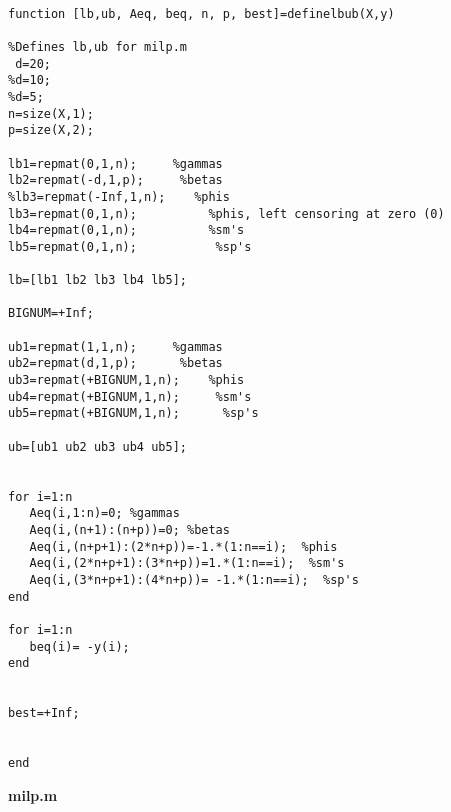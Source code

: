 \documentclass[12pt]{article}
\begin{document}
\begin{lstlisting}

function [lb,ub, Aeq, beq, n, p, best]=definelbub(X,y)

%Defines lb,ub for milp.m
 d=20;
%d=10;
%d=5;
n=size(X,1);
p=size(X,2);

lb1=repmat(0,1,n);     %gammas
lb2=repmat(-d,1,p);     %betas
%lb3=repmat(-Inf,1,n);    %phis
lb3=repmat(0,1,n);          %phis, left censoring at zero (0)
lb4=repmat(0,1,n);          %sm's
lb5=repmat(0,1,n);           %sp's

lb=[lb1 lb2 lb3 lb4 lb5];

BIGNUM=+Inf;

ub1=repmat(1,1,n);     %gammas
ub2=repmat(d,1,p);      %betas
ub3=repmat(+BIGNUM,1,n);    %phis
ub4=repmat(+BIGNUM,1,n);     %sm's
ub5=repmat(+BIGNUM,1,n);      %sp's

ub=[ub1 ub2 ub3 ub4 ub5];


for i=1:n
   Aeq(i,1:n)=0; %gammas
   Aeq(i,(n+1):(n+p))=0; %betas
   Aeq(i,(n+p+1):(2*n+p))=-1.*(1:n==i);  %phis
   Aeq(i,(2*n+p+1):(3*n+p))=1.*(1:n==i);  %sm's
   Aeq(i,(3*n+p+1):(4*n+p))= -1.*(1:n==i);  %sp's
end

for i=1:n
   beq(i)= -y(i); 
end


best=+Inf;


end

\end{lstlisting}



\textbf{milp.m}
\end{document}
